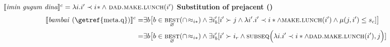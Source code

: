 $\denote[c]{\textit{imin gugum dina}}=\lambda i.i'\prec i\!*\wedge\ \textsc{dad.make.lunch}(i')$
\a \textbf{Substitution of prejacent ()}
\begin{align*}
 	\denote[c]{\textit{bambai \textup{(\getref{meta.q})}}}=&\exists b\big[b\in\underset{\varnothing}{\textsc{best}}(\cap\!\approx_{i*})\wedge \exists i'_b[i'\succ j\wedge \lambda i'.i'\prec i*\wedge\textsc{make.lunch}(i')\wedge\mu(j,i')\leq s_c]\big]\\
	=&\exists b\big[b\in\underset{\varnothing}{\textsc{best}}(\cap\!\approx_{i*})\wedge \exists i'_b[i'\succ i_r\wedge \textsc{subseq}\Big(\lambda i.i'\prec i*\wedge\textsc{dad.make.lunch}(i'),j\Big)]
\end{align*}

%
%


%


